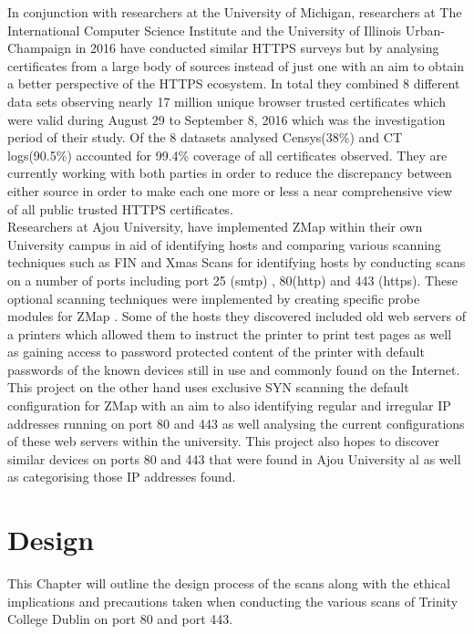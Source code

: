 \documentclass[a4wide,leqno,12pt]{report}
\begin{document}
In conjunction with researchers at the University of Michigan, researchers at The International Computer Science Institute and the University of Illinois Urban-Champaign in 2016 have conducted similar HTTPS surveys but by analysing certificates from a large body of sources instead of just one with an aim to obtain a better perspective of the HTTPS ecosystem. In total they combined 8 different data sets observing nearly 17 million unique browser trusted certificates which were valid during August 29 to September 8, 2016 which was the investigation period of their study. Of the 8 datasets analysed Censys(38\%) and CT logs(90.5\%) accounted for 99.4\% coverage of all certificates observed. They are currently working with both parties in order to reduce the discrepancy between either source in order to make each one more or less a near comprehensive view of all public trusted HTTPS certificates\cite{vandersloot2016towards}.\\

Researchers at Ajou University, have  implemented ZMap within their own University campus in aid of identifying hosts and comparing various scanning techniques such as FIN \cite{arkin1999network} and Xmas Scans \cite{arkin1999network}for identifying hosts by conducting scans on a number of ports including port 25 (smtp) , 80(http) and 443 (https). These optional scanning techniques were implemented by creating specific probe modules for ZMap \cite{lee2016implementation}. Some of the hosts they discovered included old web servers of a printers which allowed them to instruct the printer to print test pages as well as gaining access to password protected content of the printer with default passwords of the known devices still in use and commonly found on the Internet. This project on the other hand uses exclusive SYN scanning \cite{de1999review} the default configuration for ZMap with an aim to also identifying regular and irregular IP addresses running on port 80 and 443 as well analysing the current configurations of these web servers within the university. This project also hopes to discover similar devices on ports 80 and 443 that were found in Ajou University al as well as categorising those IP addresses found.\\

\chapter{Design}
This Chapter will outline the design process of the scans  along with the ethical implications and precautions taken when conducting the various scans of Trinity College Dublin on port 80 and port 443.
\end{document}
